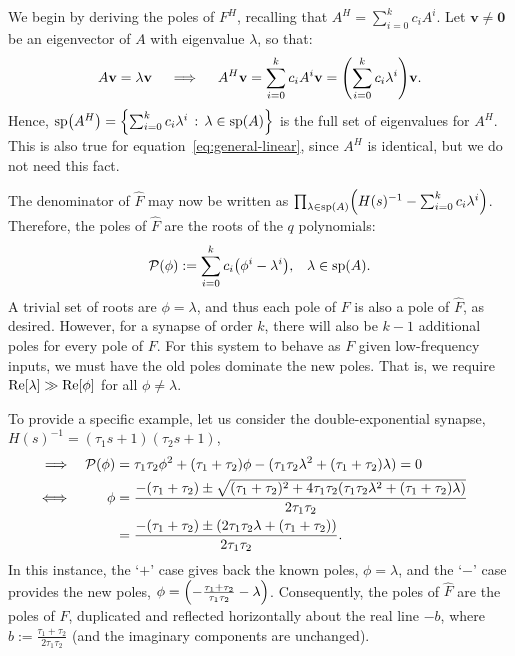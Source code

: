 \documentclass[12pt]{article}
\theoremstyle{definition}
\renewcommand{\vec}{\mathbf}  %
\let\originalleft\left
\let\originalright\right
\renewcommand{\left}{\mathopen{}\mathclose\bgroup\originalleft}
\renewcommand{\right}{\aftergroup\egroup\originalright}
\begin{document}
We begin by deriving the poles of $F^H$, recalling that $A^H = \sum_{i=0}^k c_i A^i$.
Let $\vec{v} \ne \vec{0}$ be an eigenvector of $A$ with eigenvalue $\lambda$, %
so that:
\begin{align*}
A\vec{v} = \lambda \vec{v} \quad \implies \quad A^H \vec{v} = \sum_{i=0}^k c_i A^i \vec{v} = \left( \sum_{i=0}^k c_i \lambda^i \right) \vec{v} \text{.}
\end{align*}
Hence, $\text{sp}\left(A^H \right) = \left\{  \sum_{i=0}^k c_i \lambda^i \,:\, \lambda \in \text{sp}(A) \right\}$ is the full set of eigenvalues for $A^H$.
This is also true for equation~\ref{eq:general-linear}, since $A^H$ is identical, but we do not need this fact.

The denominator of $\hat{F}$ may now be written as $\prod_{\lambda \in \text{sp}(A)} \left( H(s)^{-1} - \sum_{i=0}^k c_i \lambda^i \right)$.
Therefore, the poles of $\hat{F}$ are the roots of the $q$ polynomials:
\begin{equation*}
\mathcal{P}(\phi) := \sum_{i=0}^k c_i \left( \phi^i - \lambda^i \right) \text{,} \quad \lambda \in \text{sp}(A) \text{.}
\end{equation*}
A trivial set of roots are $\phi = \lambda$, and thus each pole of $F$ is also a pole of $\hat{F}$, as desired.
However, for a synapse of order $k$, there will also be $k - 1$ additional poles for every pole of $F$.
For this system to behave as $F$ given low-frequency inputs, we must have the old poles dominate the new poles.
That is, we require $\text{Re} \left[ \lambda \right] \gg \text{Re} \left[ \phi \right]$ for all $\phi \ne \lambda$.

To provide a specific example, let us consider the double-exponential synapse, $H(s)^{-1} = (\tau_1 s + 1)(\tau_2 s + 1)$,
\begin{align*}
\implies && \mathcal{P}(\phi) &= \tau_1 \tau_2 \phi^2 + (\tau_1 + \tau_2) \phi - (\tau_1 \tau_2 \lambda^2 + (\tau_1 + \tau_2) \lambda) = 0 && \\
\iff && \phi &= \frac{-(\tau_1 + \tau_2) \pm \sqrt{(\tau_1 + \tau_2)^2 + 4\tau_1 \tau_2 \left(\tau_1 \tau_2 \lambda^2 + (\tau_1 + \tau_2) \lambda \right)}}{2 \tau_1 \tau_2} && \\
&& &= \frac{-(\tau_1 + \tau_2) \pm \left(2 \tau_1 \tau_2 \lambda + (\tau_1 + \tau_2) \right)}{2 \tau_1 \tau_2} \text{.} &&
\end{align*}
In this instance, the `$+$' case gives back the known poles, $\phi = \lambda$, and the `$-$' case provides the new poles, $\phi = \left(- \frac{\tau_1 + \tau_2}{\tau_1 \tau_2} - \lambda \right)$.
Consequently, the poles of $\hat{F}$ are the poles of $F$, duplicated and reflected horizontally about the real line $- b$, where $b := \frac{\tau_1 + \tau_2}{2 \tau_1 \tau_2}$ (and the imaginary components are unchanged).
\end{document}

